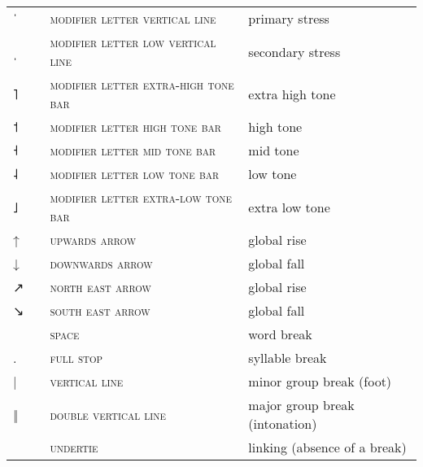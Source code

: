 \label{tab:ipa_leftovers}
 \tablelasttail{\bottomrule}

\begin{center}
\begin{xtabular}{ l L{1.2cm} L{5.4cm} L{4cm} }
{\large ˈ} &  & \textsc{modifier letter vertical line} & primary stress \\
{\large ˌ} &  & \textsc{modifier letter low vertical line} & secondary stress \\
{˥} &  & \textsc{modifier letter extra-high tone bar} & extra high tone \\
{˦} &  & \textsc{modifier letter high tone bar} & high tone \\
{˧} &  & \textsc{modifier letter mid tone bar} & mid tone \\
{˨} &  & \textsc{modifier letter low tone bar} & low tone \\
{˩} &  & \textsc{modifier letter extra-low tone bar} & extra low tone \\
{↑} &  & \textsc{upwards arrow} & global rise \\
{↓} &  & \textsc{downwards arrow} & global fall \\
{↗} &  & \textsc{north east arrow} & global rise \\
{↘} &  & \textsc{south east arrow} & global fall \\
 &  & \textsc{space} & word break \\
{\large.} &  & \textsc{full stop} & syllable break \\
{|} &  & \textsc{vertical line} & minor group break (foot) \\
{‖} &  & \textsc{double vertical line} & major group break (intonation) \\
 &  & \textsc{undertie} & linking (absence of a break) \\
\end{xtabular}
\end{center}
